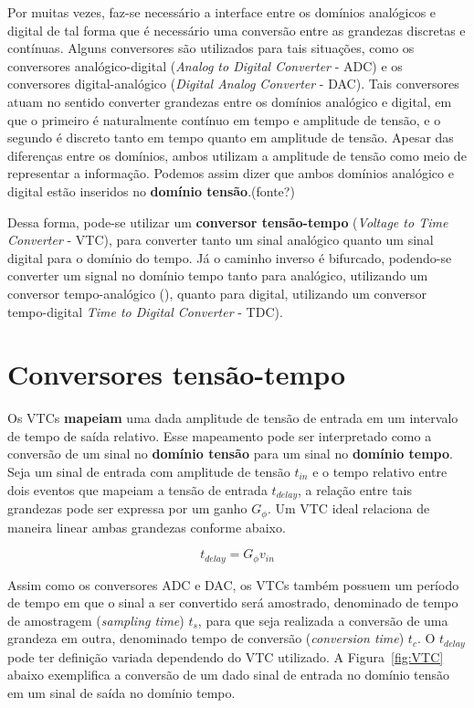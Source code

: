 \documentclass[
	12pt,				%
	openright,			%
	twoside,			%
	a4paper,			%
	english,			%
	french,				%
	spanish,			%
	brazil,				%
	]{abntex2}
\begin{document}
    Por muitas vezes, faz-se necessário a interface entre os domínios analógicos e digital de tal forma que é necessário uma conversão entre as grandezas discretas e contínuas. Alguns conversores são utilizados para tais situações, como os conversores analógico-digital (\textit{Analog to Digital Converter} - ADC) e os conversores digital-analógico (\textit{Digital Analog Converter} - DAC). Tais conversores atuam no sentido converter grandezas entre os domínios analógico e digital, em que o primeiro é naturalmente contínuo em tempo e amplitude de tensão, e o segundo é discreto tanto em tempo quanto em amplitude de tensão. Apesar das diferenças entre os domínios, ambos utilizam a amplitude de tensão como meio de representar a informação. Podemos assim dizer que ambos domínios analógico e digital estão inseridos no \textbf{domínio tensão}.(fonte?)

	Dessa forma, pode-se utilizar um \textbf{conversor tensão-tempo} (\textit{Voltage to Time Converter} - VTC), para converter tanto um sinal analógico quanto um sinal digital para o domínio do tempo. Já o caminho inverso é bifurcado, podendo-se converter um signal no domínio tempo tanto para analógico, utilizando um conversor tempo-analógico (), quanto para digital, utilizando um conversor tempo-digital \textit{Time to Digital Converter} - TDC).

	\section{Conversores tensão-tempo}

		Os VTCs \textbf{mapeiam} uma dada amplitude de tensão de entrada em um intervalo de tempo de saída relativo. Esse mapeamento pode ser interpretado como a conversão de um sinal no \textbf{domínio tensão} para um sinal no \textbf{domínio tempo}. Seja um sinal de entrada com amplitude de tensão $t_{in}$ e o tempo relativo entre dois eventos que mapeiam a tensão de entrada $t_{delay}$, a relação entre tais grandezas pode ser expressa por um ganho $G_{\phi}$\cite{Shivani}. Um VTC ideal relaciona de maneira linear ambas grandezas conforme abaixo.

		$$t_{delay}=G_{\phi}v_{in}$$

		Assim como os conversores ADC e DAC, os VTCs também possuem um período de tempo em que o sinal a ser convertido será amostrado, denominado de tempo de amostragem (\textit{sampling time}) $t_s$, para que seja realizada a conversão de uma grandeza em outra, denominado tempo de conversão (\textit{conversion time}) $t_c$. O $t_{delay}$ pode ter definição variada dependendo do VTC utilizado. A Figura~\ref{fig:VTC} abaixo exemplifica a conversão de um dado sinal de entrada no domínio tensão em um sinal de saída no domínio tempo.
\end{document}
